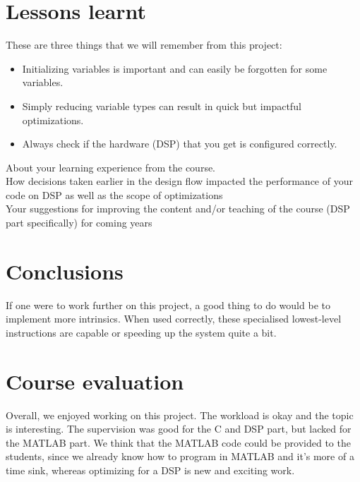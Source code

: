 \documentclass[a4paper]{article}
\begin{document}
\section{Lessons learnt}
These are three things that we will remember from this project:
\begin{itemize}
\item Initializing variables is important and can easily be forgotten for some variables.
\item Simply reducing variable types can result in quick but impactful optimizations.
\item Always check if the hardware (DSP) that you get is configured correctly.
\end{itemize}

About your learning experience from the course.\\
How decisions taken earlier in the design flow impacted the performance of your code on DSP as
well as the scope of optimizations\\
 Your suggestions for improving the content and/or teaching of the course (DSP part specifically) for
coming years

\section{Conclusions}
If one were to work further on this project, a good thing to do would be to implement more intrinsics. When used correctly, these specialised lowest-level instructions are capable or speeding up the system quite a bit.

\section{Course evaluation}
Overall, we enjoyed working on this project. The workload is okay and the topic is interesting. The supervision was good for the C and DSP part, but lacked for the MATLAB part.
We think that the MATLAB code could be provided to the students, since we already know how to program in MATLAB and it's more of a time sink, whereas optimizing for a DSP is new and exciting work.
\end{document}
